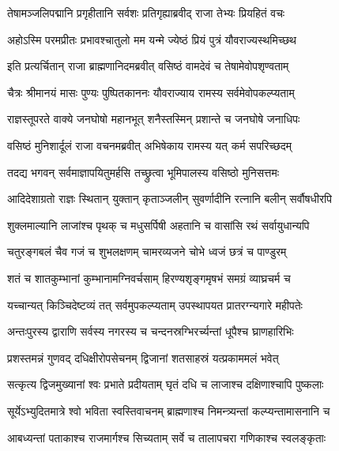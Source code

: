 
\twolineshloka
{तेषामञ्जलिपद्मानि प्रगृहीतानि सर्वशः}
{प्रतिगृह्याब्रवीद् राजा तेभ्यः प्रियहितं वचः} %

\twolineshloka
{अहोऽस्मि परमप्रीतः प्रभावश्चातुलो मम}
{यन्मे ज्येष्ठं प्रियं पुत्रं यौवराज्यस्थमिच्छथ} %

\twolineshloka
{इति प्रत्यर्चितान् राजा ब्राह्मणानिदमब्रवीत्}
{वसिष्ठं वामदेवं च तेषामेवोपशृण्वताम्} %

\twolineshloka
{चैत्रः श्रीमानयं मासः पुण्यः पुष्पितकाननः}
{यौवराज्याय रामस्य सर्वमेवोपकल्प्यताम्} %

\twolineshloka
{राज्ञस्तूपरते वाक्ये जनघोषो महानभूत्}
{शनैस्तस्मिन् प्रशान्ते च जनघोषे जनाधिपः} %

\twolineshloka
{वसिष्ठं मुनिशार्दूलं राजा वचनमब्रवीत्}
{अभिषेकाय रामस्य यत् कर्म सपरिच्छदम्} %

\twolineshloka
{तदद्य भगवन् सर्वमाज्ञापयितुमर्हसि}
{तच्छ्रुत्वा भूमिपालस्य वसिष्ठो मुनिसत्तमः} %

\twolineshloka
{आदिदेशाग्रतो राज्ञः स्थितान् युक्तान् कृताञ्जलीन्}
{सुवर्णादीनि रत्नानि बलीन् सर्वौषधीरपि} %

\twolineshloka
{शुक्लमाल्यानि लाजांश्च पृथक् च मधुसर्पिषी}
{अहतानि च वासांसि रथं सर्वायुधान्यपि} %

\twolineshloka
{चतुरङ्गबलं चैव गजं च शुभलक्षणम्}
{चामरव्यजने चोभे ध्वजं छत्रं च पाण्डुरम्} %

\twolineshloka
{शतं च शातकुम्भानां कुम्भानामग्निवर्चसाम्}
{हिरण्यशृङ्गमृषभं समग्रं व्याघ्रचर्म च} %

\twolineshloka
{यच्चान्यत् किञ्चिदेष्टव्यं तत् सर्वमुपकल्प्यताम्}
{उपस्थापयत प्रातरग्न्यगारे महीपतेः} %

\twolineshloka
{अन्तःपुरस्य द्वाराणि सर्वस्य नगरस्य च}
{चन्दनस्रग्भिरर्च्यन्तां धूपैश्च घ्राणहारिभिः} %

\twolineshloka
{प्रशस्तमन्नं गुणवद् दधिक्षीरोपसेचनम्}
{द्विजानां शतसाहस्रं यत्प्रकाममलं भवेत्} %

\twolineshloka
{सत्कृत्य द्विजमुख्यानां श्वः प्रभाते प्रदीयताम्}
{घृतं दधि च लाजाश्च दक्षिणाश्चापि पुष्कलाः} %

\twolineshloka
{सूर्येऽभ्युदितमात्रे श्वो भविता स्वस्तिवाचनम्}
{ब्राह्मणाश्च निमन्त्र्यन्तां कल्प्यन्तामासनानि च} %

\twolineshloka
{आबध्यन्तां पताकाश्च राजमार्गश्च सिच्यताम्}
{सर्वे च तालापचरा गणिकाश्च स्वलङ्कृताः} %

